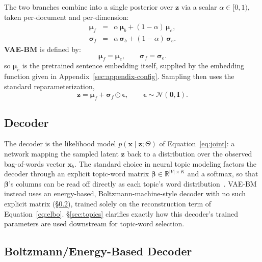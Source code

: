 \documentclass[11pt]{article}
\begin{document}
The two branches combine into a single posterior over $\mathbf{z}$ via a scalar $\alpha\in[0,1)$, taken per-document and per-dimension:
\begin{eqnarray}
\boldsymbol{\mu}_f &=& \alpha\,\boldsymbol{\mu}_b + (1-\alpha)\,\boldsymbol{\mu}_e, \label{eq:alpha-fusion}\\
\boldsymbol{\sigma}_f &=& \alpha\,\boldsymbol{\sigma}_b + (1-\alpha)\,\boldsymbol{\sigma}_e. \label{eq:alpha-fusion-sigma}
\end{eqnarray}
\textbf{VAE-BM} is defined by:
\begin{equation}
\boldsymbol{\mu}_f = \boldsymbol{\mu}_e, \qquad \boldsymbol{\sigma}_f = \boldsymbol{\sigma}_e.
\label{eq:final-fusion}
\end{equation}
so $\boldsymbol{\mu}_e$ is the pretrained sentence embedding itself, supplied by the embedding function given in Appendix~\ref{sec:appendix-config}. Sampling then uses the standard reparameterization,
\begin{equation}
\mathbf{z} = \boldsymbol{\mu}_f + \boldsymbol{\sigma}_f \odot \boldsymbol{\epsilon}, \qquad \boldsymbol{\epsilon}\sim\mathcal{N}(\mathbf{0},\mathbf{I}).
\label{eq:reparam}
\end{equation}

\subsection{Decoder}
\label{sec:decoder}

The decoder is the likelihood model $p(\mathbf{x}\mid\mathbf{z};\Theta)$ of Equation~\ref{eq:joint}: a network mapping the sampled latent $\mathbf{z}$ back to a distribution over the observed bag-of-words vector $\mathbf{x}_b$. The standard choice in neural topic modeling factors the decoder through an explicit topic-word matrix $\boldsymbol{\beta}\in\mathbb{R}^{|V|\times K}$ and a softmax, so that $\boldsymbol{\beta}$'s columns can be read off directly as each topic's word distribution~\citep{miao2016nvdm,srivastava2017prodlda,hicot2025}. VAE-BM instead uses an energy-based, Boltzmann-machine-style decoder with no such explicit matrix (\S\ref{sec:be-decoder}), trained solely on the reconstruction term of Equation~\ref{eq:elbo}. \S\ref{sec:topics} clarifies exactly how this decoder's trained parameters are used downstream for topic-word selection.

\subsection{Boltzmann/Energy-Based Decoder}
\label{sec:be-decoder}
\end{document}
